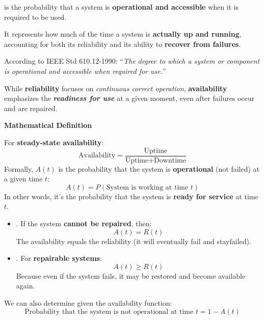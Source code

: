 \newpage

\begin{definitionbox}[: Availability]
     is the probability that a system is \textbf{operational and accessible} when it is required to be used.

    It represents how much of the time a system is \textbf{actually up and running}, accounting for both its reliability and its ability to \textbf{recover from failures}.

    \highspace
    According to IEEE Std 610.12-1990: ``\emph{The degree to which a system or component is operational and accessible when required for use.}''
\end{definitionbox}

\noindent
While \textbf{reliability} focuses on \emph{continuous correct operation}, \textbf{availability} emphasizes the \textbf{\emph{readiness for use}} at a given moment, even after failures occur and are repaired.

\highspace
\begin{flushleft}
    \textcolor{Green3}{ \textbf{Mathematical Definition}}
\end{flushleft}
For \textbf{steady-state availability}:
\begin{equation}
    \text{Availability} = \dfrac{\text{Uptime}}{\text{Uptime} + \text{Downtime}}
\end{equation}
Formally, $A\left(t\right)$ is the probability that the system is \textbf{operational} (not failed) at a given time $t$:
\begin{equation}
    A\left(t\right) = P\left(\text{System is working at time } t\right)
\end{equation}
In other words, it's the probability that the system is \textbf{ready for service} at time $t$.
\begin{itemize}
    \item {}. If the system \textbf{cannot be repaired}, then:
    \begin{equation*}
        A(t) = R(t)
    \end{equation*}
    The availability equals the reliability (it will eventually fail and stay\break failed).
    \item {}. For \textbf{repairable systems}:
    \begin{equation*}
        A(t) \geq R(t)
    \end{equation*}
    Because even if the system fails, it may be restored and become available again.
\end{itemize}
We can also determine  given the availability function:
\begin{equation}
    \text{Probability that the system is not operational at time } t = 1 - A(t)
\end{equation}

